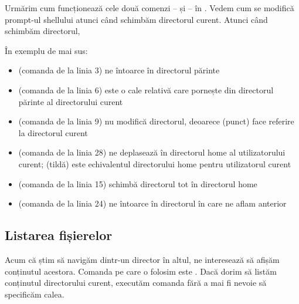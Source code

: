 Urmărim cum funcționează cele două comenzi --  și  -- în .
Vedem cum se modifică prompt-ul shellului atunci când schimbăm directorul curent.
Atunci când schimbăm directorul,


În exemplu de mai sus:
\begin{itemize}
  \item {} (comanda de la linia 3) ne întoarce în directorul părinte
  \item {} (comanda de la linia 6) este o cale relativă care pornește din directorul părinte al directorului curent
  \item {} (comanda de la linia 9) nu modifică directorul, deoarece  (punct) face referire la directorul curent
  \item {} (comanda de la linia 28) ne deplasează în directorul home al utilizatorului curent;
    \file{\textasciitilde} (tildă) este echivalentul directorului home pentru utilizatorul curent
  \item {} (comanda de la linia 15) schimbă directorul tot în directorul home
  \item {} (comanda de la linia 24) ne întoarce în directorul în care ne aflam anterior
\end{itemize}

\subsection{Listarea fișierelor}
\label{sec:fs:ls}

Acum că știm să navigăm dintr-un director în altul, ne interesează să afișăm conținutul acestora.
Comanda pe care o folosim este .
Dacă dorim să listăm conținutul directorului curent, executăm comanda  fără a mai fi nevoie să specificăm calea.

